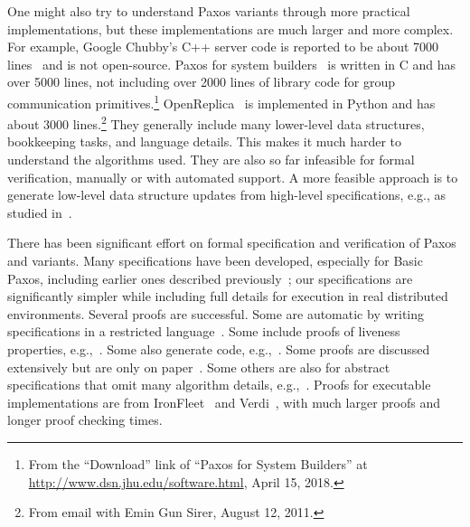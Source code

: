 \documentclass[11pt]{article}
\newcommand{\notes}[1]{} %
\begin{document}
One might also try to understand Paxos variants through more practical
implementations, but these implementations %
are much larger and more complex. %
For example, Google Chubby's C++ server code is reported to be about 7000
lines~\cite{burrows06chubby,chandra07paxos} and is not open-source.
Paxos for system builders~\cite{kirsch2008paxos,kirsch2008paxosTR} is
written in C and has over 5000 lines, not including over 2000 lines of
library code for group communication primitives.\footnote{From the
  ``Download'' link of ``Paxos for System Builders'' at
  \url{http://www.dsn.jhu.edu/software.html}, April 15, 2018.}
OpenReplica~\cite{altinbuken2012commodifying} is implemented in Python and
has about 3000 lines.\footnote{From email with Emin Gun Sirer, August 12,
  2011.}
They generally include many lower-level data structures, bookkeeping tasks,
and language details.
This makes it much harder to understand the algorithms used.  They are also
so far infeasible for formal verification, manually or with automated
support.
A more feasible approach is to generate low-level data structure 
updates from high-level specifications, e.g., as studied
in~\cite{Liu+12DistPL-OOPSLA,Liu+17DistPL-TOPLAS}.

\notes{} %

There has been significant effort on formal specification and verification
of Paxos and variants.
Many specifications have been developed, %
especially for Basic Paxos, including earlier ones described
previously~\cite{Liu+12DistPL-OOPSLA}; our specifications are significantly
simpler while including full details for execution in real distributed
environments.
Several proofs are successful.
Some are automatic by writing specifications %
in a restricted language~\cite{padon2017paxos,taube2018modular}.
Some include proofs of liveness properties,
e.g.,~\cite{hawblitzel2015ironfleet,padon2017reducing}.
Some also generate code, e.g.,~\cite{georgiou09automated,taube2018modular}.
Some proofs are discussed extensively but are only on
paper~\cite{garcia18paxos}.
Some others are also for abstract specifications that omit many algorithm
details,
e.g.,~\cite{Cha+16PaxosTLAPS-FM,bobba2017design,ChaLiu18PaxosHistVarTLAPS-NFM}.
Proofs for executable implementations are from
IronFleet~\cite{hawblitzel2015ironfleet} and Verdi~\cite{wilcox2015verdi},
with much larger proofs and longer proof checking times.
\end{document}
